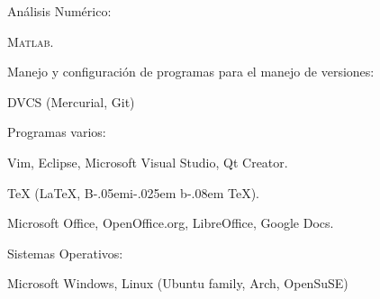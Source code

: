 \documentclass[10pt]{article}
\renewcommand{\section}[1]{\pagebreak[3]%
    \vspace{1.3\baselineskip}%
    \phantomsection\addcontentsline{toc}{section}{#1}%
    \noindent\llap{\scshape\smash{\parbox[t]{\marginparwidth}{\hyphenpenalty=10000\raggedright #1}}}%
    \vspace{-\baselineskip}\par}
\newcommand{\halfblankline}{\quad\vspace{-0.5\baselineskip}\pagebreak[3]}
\providecommand\BibTeX{{B\kern-.05em{\sc i\kern-.025em b}\kern-.08em \TeX}}
\providecommand\Matlab{\textsc{Matlab}}
\begin{document}
\halfblankline

Análisis Numérico:
%
\begin{innerlist}
    \item \Matlab.
\end{innerlist}

\halfblankline

Manejo y configuración de programas para el manejo de versiones:
%
\begin{innerlist}
    \item DVCS (Mercurial, Git)
\end{innerlist}

\halfblankline

Programas varios:
%
\begin{innerlist}
    \item Vim, Eclipse, Microsoft Visual Studio, Qt Creator.
    \item \TeX{} (\LaTeX{}, \BibTeX{}).
    \item Microsoft Office, OpenOffice.org, LibreOffice, Google Docs.
\end{innerlist}

\halfblankline

Sistemas Operativos:
%
\begin{innerlist}
    \item Microsoft Windows, Linux (Ubuntu family, Arch, OpenSuSE)
\end{innerlist}


%
\end{document}
